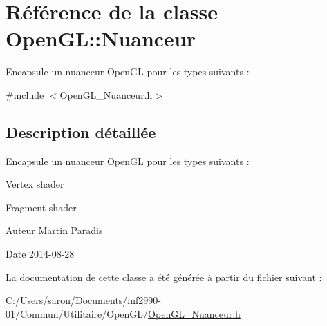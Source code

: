 \hypertarget{class_open_g_l_1_1_nuanceur}{\section{Référence de la classe Open\-G\-L\-:\-:Nuanceur}
\label{class_open_g_l_1_1_nuanceur}
}


Encapsule un nuanceur Open\-G\-L pour les types suivants \-:  




{\ttfamily \#include $<$Open\-G\-L\-\_\-\-Nuanceur.\-h$>$}



\subsection{Description détaillée}
Encapsule un nuanceur Open\-G\-L pour les types suivants \-: 


\begin{DoxyItemize}
\item Vertex shader
\item Fragment shader
\end{DoxyItemize}

\begin{DoxyAuthor}{Auteur}
Martin Paradis 
\end{DoxyAuthor}
\begin{DoxyDate}{Date}
2014-\/08-\/28 
\end{DoxyDate}


La documentation de cette classe a été générée à partir du fichier suivant \-:\begin{DoxyCompactItemize}
\item 
C\-:/\-Users/saron/\-Documents/inf2990-\/01/\-Commun/\-Utilitaire/\-Open\-G\-L/\hyperlink{_open_g_l___nuanceur_8h}{Open\-G\-L\-\_\-\-Nuanceur.\-h}\end{DoxyCompactItemize}
